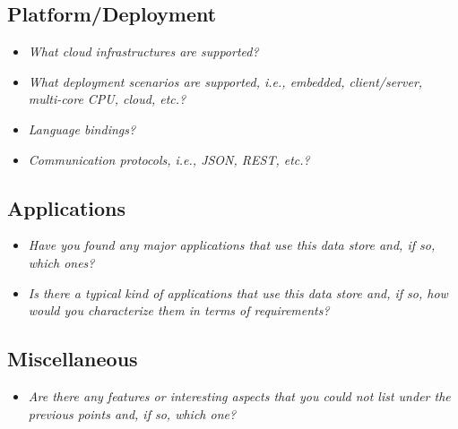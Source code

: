 \subsection{Platform/Deployment}
\begin{itemize}
\item \emph{What cloud infrastructures are supported?}
\item \emph{What deployment scenarios are supported, i.e., embedded, client/server, multi-core CPU, cloud, etc.?}
\item \emph{Language bindings?}
\item \emph{Communication protocols, i.e., JSON, REST, etc.?}
\end{itemize}

\subsection{Applications}
\begin{itemize}
\item \emph{Have you found any major applications that use this data store and, if so, which ones?}
\item \emph{Is there a typical kind of applications that use this data store and, if so, how would you characterize them in terms of requirements?}
\end{itemize}

\subsection{Miscellaneous}
\begin{itemize}
\item \emph{Are there any features or interesting aspects that you could not list under the previous points and, if so, which one?}
\end{itemize}

\newpage